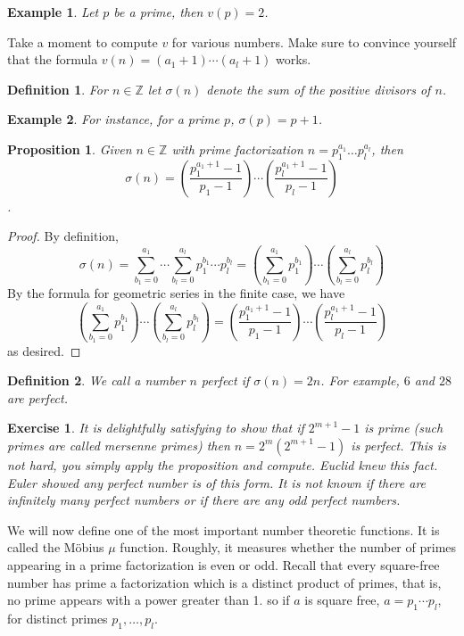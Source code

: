 \documentclass{article}
\theoremstyle{problemstyle}
\newtheorem{example}{Example}
\newtheorem{proposition}{Proposition}
\newtheorem{exercise}{Exercise}
\newtheorem{definition}{Definition}
\begin{document}
\begin{example}
Let $p$ be a prime, then $v(p) = 2$.  
\end{example}

Take a moment to compute $v$ for various numbers. Make sure to convince yourself that the formula $v(n) = (a_1+1)\cdots(a_l+1)$ works. 

\begin{definition}
For $n \in \mathbb{Z}$ let $\sigma(n)$ denote the sum of the positive divisors of $n$. 
\end{definition}

\begin{example}
For instance, for a prime $p$, $\sigma(p) = p+1$. 
\end{example}

\begin{proposition}
Given $n \in \mathbb{Z}$ with prime factorization $n = p_1^{a_1}\ldots p_l^{a_l}$, then $$\sigma(n) = \left(\frac{p_1^{a_1+1}-1}{p_1-1}\right)\cdots\left(\frac{p_l^{a_1+1}-1}{p_l-1}\right)$$.
\end{proposition}

\begin{proof}
By definition, $$\sigma(n) = \sum_{b_1 = 0}^{a_1}\cdots\sum_{b_l = 0}^{a_l}p_1^{b_1}\cdots p_l^{b_l} = \left(\sum_{b_1 = 0}^{a_1} p_1^{b_1}\right)\cdots\left(\sum_{b_l = 0}^{a_l}p_l^{b_l}\right)$$ By the formula for geometric series in the finite case, we have $$\left(\sum_{b_1 = 0}^{a_1} p_1^{b_1}\right)\cdots\left(\sum_{b_l = 0}^{a_l}p_l^{b_l}\right) = \left(\frac{p_1^{a_1+1}-1}{p_1-1}\right)\cdots\left(\frac{p_l^{a_1+1}-1}{p_l-1}\right)$$ as desired.
\end{proof}

\begin{definition}
We call a number $n$ perfect if $\sigma(n) = 2n$. For example, $6$ and $28$ are perfect. 
\end{definition}

\begin{exercise}
It is delightfully satisfying to show that if $2^{m+1}-1$ is prime (such primes are called mersenne primes) then $n = 2^m(2^{m+1}-1)$ is perfect. This is not hard, you simply apply the proposition and compute. Euclid knew this fact. Euler showed any perfect number is of this form. It is not known if there are infinitely many perfect numbers or if there are any odd perfect numbers. 
\end{exercise}

We will now define one of the most important number theoretic functions. It is called the M\"obius $\mu$ function. Roughly, it measures whether the number of primes appearing in a prime factorization is even or odd. Recall that every square-free number has prime a factorization which is a distinct product of primes, that is, no prime appears with a power greater than 1. so if $a$ is square free, $a = p_1\cdots p_l$, for distinct primes $p_1,\ldots,p_l$.
\end{document}
